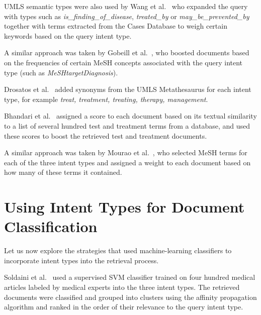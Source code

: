 UMLS semantic types were also used by Wang et al.\ \cite{udel} who expanded the query
with types such as \emph{is\_finding\_of\_disease}, \emph{treated\_by} or
\emph{may\_be\_prevented\_by} together with terms extracted from the Cases Database to weigh certain keywords
based on the query intent type.

A similar approach was taken by Gobeill et al.\ \cite{bitem}, who boosted documents based on the
frequencies of certain MeSH
concepts associated with the query intent type (such as \emph{MeSHtargetDiagnosis}).

Drosatos et al.\ \cite{duth} added synonyms from the UMLS Metathesaurus for each intent type, for example
\emph{treat, treatment, treating, therapy, management}.

Bhandari et al.\ \cite{ir.cs.sfsu} assigned a score to each document based on
its textual similarity to a list of several hundred test and treatment terms from a database,
and used these scores to boost the retrieved test and treatment documents.

A similar approach was taken by Mourao et al.\ \cite{novasearch}, who selected MeSH
terms for each of the three intent types and assigned a weight to each
document based on how many of these terms it contained.
%

\section{Using Intent Types for Document Classification}
Let us now explore the strategies that used machine-learning classifiers to
incorporate intent types into the retrieval process.

Soldaini et al.\ \cite{soldani} used a supervised SVM classifier trained on four hundred medical articles
labeled by medical experts into the three intent types. The retrieved documents were classified
and grouped into clusters using the affinity propagation algorithm and ranked in the order of their relevance
to the query intent type.

